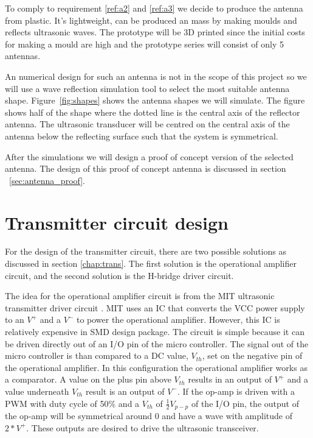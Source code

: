 To comply to requirement \ref{ref:a2} and \ref{ref:a3} we decide to produce the antenna from plastic. It's lightweight, can be produced an mass by making moulds and reflects ultrasonic waves.
The prototype will be 3D printed since the initial costs for making a mould are high and the prototype series will consist of only 5 antennas.

An numerical design for such an antenna is not in the scope of this project so we will use a wave reflection simulation tool to select the most suitable antenna shape.
Figure~\ref{fig:shapes} shows the antenna shapes we will simulate.
The figure shows half of the shape where the dotted line is the central axis of the reflector antenna.
The ultrasonic transducer will be centred on the central axis of the antenna below the reflecting surface such that the system is symmetrical.

After the simulations we will design a proof of concept version of the selected antenna.
The design of this proof of concept antenna is discussed in section ~\ref{sec:antenna_proof}.

\section{Transmitter circuit design}
\label{sec:transcircuit}

For the design of the transmitter circuit, there are two possible solutions as discussed in section \ref{chap:trans}. The first solution is the operational amplifier circuit, and the second solution is the H-bridge driver circuit.

The idea for the operational amplifier circuit is from the MIT ultrasonic transmitter driver circuit \cite{Priyantha2005}. MIT uses an IC that converts the VCC power supply to an $V^{+}$ and a $V^{-}$ to power the operational amplifier. However, this IC is relatively expensive in SMD design package. The circuit is simple because it can be driven directly out of an I/O pin of the micro controller. The signal out of the micro controller is than compared to a DC value, $V_{th}$, set on the negative pin of the operational amplifier. In this configuration the operational amplifier works as a comparator. A value on the plus pin above $V_{th}$ results in an output of $V^{+}$ and a value underneath $V_{th}$ result is an output of $V^{-}$. If the op-amp is driven with a PWM with duty cycle of 50\% and a $V_{th}$ of $\frac{1}{2}V_{p-p}$ of the I/O pin, the output of the op-amp will be symmetrical around 0 and have a wave with amplitude of $2 * V^{+}$. These outputs are desired to drive the ultrasonic transceiver.

